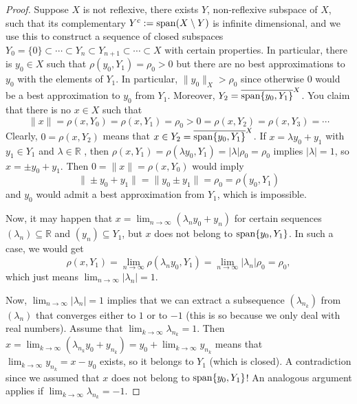 \documentclass[12pt, reqno]{amsart}
\theoremstyle{definition}
\theoremstyle{remark}
\numberwithin{equation}{section}
\begin{document}
\begin{proof}
Suppose $X$ is not reflexive,  there exists $Y$, non-reflexive subspace of $X$, such that its complementary $Y^c:={\rm span}(X\setminus Y)$ is infinite dimensional, and we use this to construct a sequence of closed subspaces $Y_0=\{0\}\subset \cdots \subset Y_n \subset Y_{n+1}\subset \cdots\subset X$ with certain properties. In particular, there is $y_0\in X$ such that $\rho(y_0,Y_1)=\rho_0>0$ but there are no best approximations to $y_0$ with the elements of $Y_1$. In particular, $\|y_0\|_X>\rho_0$ since otherwise $0$ would be a best approximation to $y_0$ from $Y_1$.  Moreover, $Y_2=\overline{{\rm span}\{y_0,Y_1\}}^X$. You claim that there is no $x\in X$ such that 
\[
\|x\|=\rho(x,Y_0)=\rho (x,Y_1)=\rho_0>0=\rho(x,Y_2)=\rho(x,Y_3)=\cdots 
\]
Clearly, $0=\rho(x,Y_2)$ means that $x\in Y_2=\overline{{\rm span}\{y_0,Y_1\}}^X$. If $x=\lambda y_0+y_1$ with $y_1\in Y_1$ and $\lambda\in \mathbb{R}$ , then $\rho(x,Y_1)=\rho(\lambda y_0,Y_1)=|\lambda|\rho_0=\rho_0$ implies $|\lambda|=1$, so $x=\pm y_0+y_1$. Then $0=\|x\|=\rho(x,Y_0)$ would imply $$\|\pm y_0+y_1\|=\|y_0\pm y_1\|=\rho_0=\rho(y_0,Y_1)$$ and $y_0$ would admit a best approximation from $Y_1$, which is impossible. 

Now, it may happen that $x=\lim_{n\to\infty}(\lambda_ny_0+y_n)$ for certain sequences $(\lambda_n)\subseteq \mathbb{R}$ and $(y_n)\subseteq Y_1$, but $x$ does not belong to ${\rm span}\{y_0,Y_1\}$.  In such a case, we would get
$$\rho(x,Y_1)=\lim_{n\to\infty}\rho
(\lambda_n y_0,Y_1)=\lim_{n\to\infty}|\lambda_n|\rho_0=\rho_0,$$ which just means $\lim_{n\to\infty}|\lambda_n|=1$. 


Now, $\lim_{n\to\infty}|\lambda_n|=1$ implies that we can extract a subsequence $(\lambda_{n_k})$ from $(\lambda_n)$ that converges either to $1$ or to $-1$ (this is so because we only deal with real numbers). Assume that $\lim_{k\to\infty}\lambda_{n_k}=1$. Then $x=\lim_{k\to\infty}(\lambda_{n_k}y_0+y_{n_k})= y_0+\lim_{k\to\infty}y_{n_k}$ means that $\lim_{k\to\infty}y_{n_k}=x-y_0$ exists, so it belongs to $Y_1$ (which is closed). A contradiction since we assumed that $x$ does not belong to ${\rm span}\{y_0,Y_1\}$! An analogous argument applies if $\lim_{k\to\infty}\lambda_{n_k}=-1$. 


\end{proof}
\end{document}

